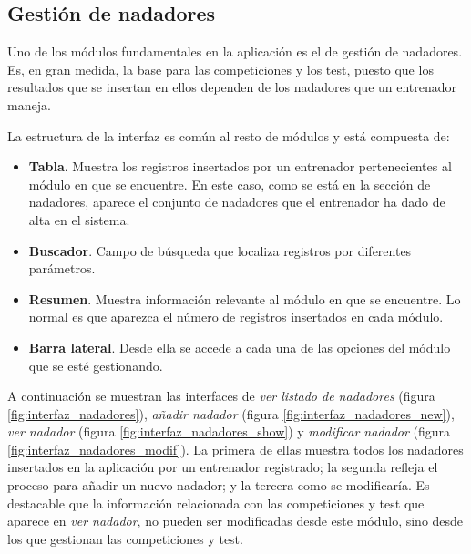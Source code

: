 	
	\subsection{Gestión de nadadores} %
		\label{sub:gestion_de_nadadores}
	
	Uno de los módulos fundamentales en la aplicación es el de gestión de nadadores. Es, en gran medida, la base para las competiciones y los test, puesto que los resultados que se insertan en ellos dependen de los nadadores que un entrenador maneja. 
	
	La estructura de la interfaz es común al resto de módulos y está compuesta de:
		
	\begin{itemize}
		\item {{\bf Tabla}. Muestra los registros insertados por un entrenador pertenecientes al módulo en que se encuentre. En este caso, como se está en la sección de nadadores, aparece el conjunto de nadadores que el entrenador ha dado de alta en el sistema.}
		\item {{\bf Buscador}. Campo de búsqueda que localiza registros por diferentes parámetros.}
		\item {{\bf Resumen}. Muestra información relevante al módulo en que se encuentre. Lo normal es que aparezca el número de registros insertados en cada módulo.}
		\item {{\bf Barra lateral}. Desde ella se accede a cada una de las opciones del módulo que se esté gestionando.}
	\end{itemize}
	
	A continuación se muestran las interfaces de {\it ver listado de nadadores} (figura \ref{fig:interfaz_nadadores}), {\it añadir nadador} (figura \ref{fig:interfaz_nadadores_new}), {\it ver nadador} (figura \ref{fig:interfaz_nadadores_show}) y {\it modificar nadador} (figura \ref{fig:interfaz_nadadores_modif}). La primera de ellas muestra todos los nadadores insertados en la aplicación por un entrenador registrado; la segunda refleja el proceso para añadir un nuevo nadador; y la tercera como se modificaría. Es destacable que la información relacionada con las competiciones y test que aparece en {\it ver nadador}, no pueden ser modificadas desde este módulo, sino desde los que gestionan las competiciones y test.
	
